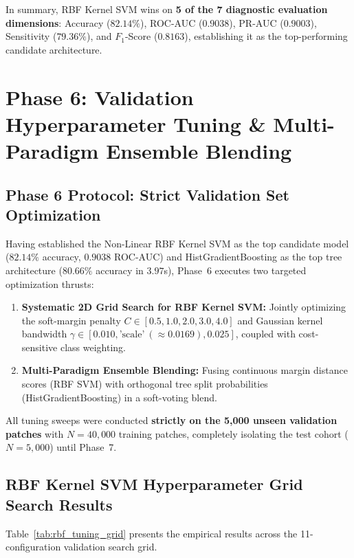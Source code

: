 \documentclass[11pt,a4paper]{article}
\begin{document}
In summary, RBF Kernel SVM wins on \textbf{5 of the 7 diagnostic evaluation dimensions}: Accuracy ($82.14\%$), ROC-AUC ($0.9038$), PR-AUC ($0.9003$), Sensitivity ($79.36\%$), and $F_1$-Score ($0.8163$), establishing it as the top-performing candidate architecture.


\section{Phase 6: Validation Hyperparameter Tuning \& Multi-Paradigm Ensemble Blending}

\subsection{Phase 6 Protocol: Strict Validation Set Optimization}
Having established the Non-Linear RBF Kernel SVM as the top candidate model ($82.14\%$ accuracy, $0.9038$ ROC-AUC) and HistGradientBoosting as the top tree architecture ($80.66\%$ accuracy in $3.97$s), Phase~6 executes two targeted optimization thrusts:
\begin{enumerate}[leftmargin=*, noitemsep]
    \item \textbf{Systematic 2D Grid Search for RBF Kernel SVM:} Jointly optimizing the soft-margin penalty $C \in [0.5, 1.0, 2.0, 3.0, 4.0]$ and Gaussian kernel bandwidth $\gamma \in [0.010, \text{'scale'} \ (\approx 0.0169), 0.025]$, coupled with cost-sensitive class weighting.
    \item \textbf{Multi-Paradigm Ensemble Blending:} Fusing continuous margin distance scores (RBF SVM) with orthogonal tree split probabilities (HistGradientBoosting) in a soft-voting blend.
\end{enumerate}
All tuning sweeps were conducted \textbf{strictly on the 5,000 unseen validation patches} with $N=40,000$ training patches, completely isolating the test cohort ($N=5,000$) until Phase~7.

\subsection{RBF Kernel SVM Hyperparameter Grid Search Results}
Table~\ref{tab:rbf_tuning_grid} presents the empirical results across the 11-configuration validation search grid.
\end{document}
